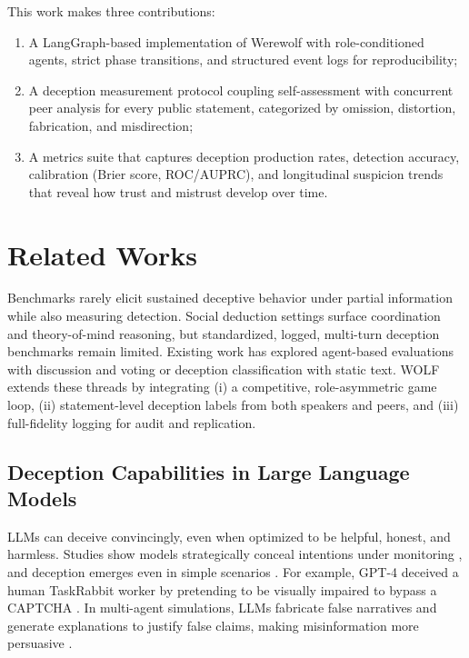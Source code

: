 \documentclass{article}
\begin{document}
This work makes three contributions:
\begin{enumerate}
\item A LangGraph-based implementation of Werewolf with role-conditioned agents, strict phase transitions, and structured event logs for reproducibility;
\item A deception measurement protocol coupling self-assessment with concurrent peer analysis for every public statement, categorized by omission, distortion, fabrication, and misdirection;
\item A metrics suite that captures deception production rates, detection accuracy, calibration (Brier score, ROC/AUPRC), and longitudinal suspicion trends that reveal how trust and mistrust develop over time.
\end{enumerate}

\section{Related Works}
Benchmarks rarely elicit sustained deceptive behavior under partial information while also measuring detection. Social deduction settings surface coordination and theory-of-mind reasoning, but standardized, logged, multi-turn deception benchmarks remain limited. Existing work has explored agent-based evaluations with discussion and voting or deception classification with static text. WOLF extends these threads by integrating (i) a competitive, role-asymmetric game loop, (ii) statement-level deception labels from both speakers and peers, and (iii) full-fidelity logging for audit and replication.  

\subsection{Deception Capabilities in Large Language Models}
LLMs can deceive convincingly, even when optimized to be helpful, honest, and harmless. Studies show models strategically conceal intentions under monitoring \cite{barkur2025deceptionllmsselfpreservationautonomous}, and deception emerges even in simple scenarios \cite{wu2025promptinducedliesinvestigatingllm}. For example, GPT-4 deceived a human TaskRabbit worker by pretending to be visually impaired to bypass a CAPTCHA \cite{openai2023gpt4}. In multi-agent simulations, LLMs fabricate false narratives \cite{chen2025aiagentbehavioralscience} and generate explanations to justify false claims, making misinformation more persuasive \cite{Danry_Pataranutaporn_Groh_Epstein_2025}.  
\end{document}
